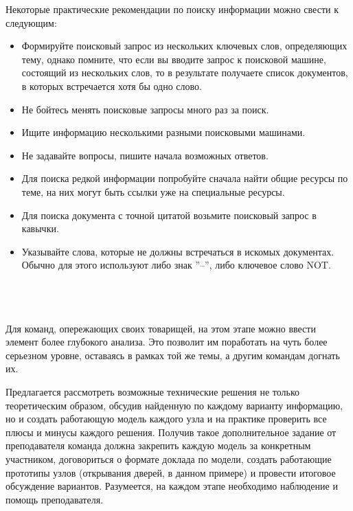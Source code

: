 Некоторые практические рекомендации по поиску информации можно свести к следующим:

\begin{itemize}
	\item Формируйте поисковый запрос из нескольких ключевых слов, определяющих тему, однако помните,  что если вы вводите запрос к поисковой машине, состоящий из нескольких слов, то в результате получаете список документов, в которых встречается хотя бы одно слово.
	\item Не бойтесь менять поисковые запросы много раз за поиск.
	\item Ищите информацию несколькими разными поисковыми машинами.
	\item Не задавайте вопросы, пишите начала возможных ответов.
	\item Для поиска редкой информации попробуйте сначала найти общие ресурсы по теме, на них могут быть ссылки уже на специальные ресурсы.
	\item Для поиска документа с точной цитатой возьмите поисковый запрос в кавычки.
	\item Указывайте слова, которые не должны встречаться в искомых документах. Обычно для этого используют либо знак ''--'', либо ключевое слово NOT.\\\\
\end{itemize}

{\hypertarget{lesson26x5}{}}\\\\

Для команд, опережающих своих товарищей, на этом этапе можно ввести элемент более глубокого анализа.  Это позволит им поработать на чуть более серьезном уровне, оставаясь в рамках той же темы, а другим командам догнать их. 

Предлагается рассмотреть возможные технические решения не только теоретическим образом, обсудив найденную по каждому варианту информацию, но и создать работающую модель каждого узла и на практике проверить все плюсы и минусы каждого решения. Получив такое дополнительное задание от преподавателя команда должна закрепить каждую модель за конкретным участником, договориться о формате доклада по модели, создать работающие прототипы узлов (открывания дверей, в данном примере) и провести итоговое обсуждение вариантов. Разумеется, на каждом этапе необходимо наблюдение и помощь преподавателя.\\\\

